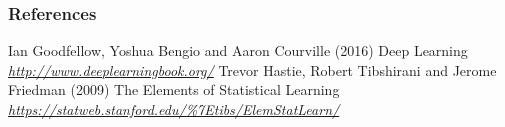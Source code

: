\begin{vbframe}
\frametitle{References}
\footnotesize{
\begin{thebibliography}{99}
 Ian Goodfellow, Yoshua Bengio and Aaron Courville (2016)
\newblock Deep Learning
\newblock \emph{\url{http://www.deeplearningbook.org/}}
 Trevor Hastie, Robert Tibshirani and Jerome Friedman (2009)
\newblock The Elements of Statistical Learning
\newblock \emph{\url{https://statweb.stanford.edu/\%7Etibs/ElemStatLearn/}}
\end{thebibliography}
}
\end{vbframe}

\endlecture

